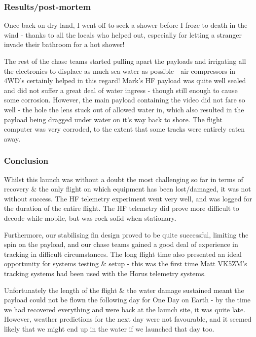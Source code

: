 \documentclass[a4paper,12pt]{article}
\begin{document}
\begin{appendices}
\subsubsection*{Results/post-mortem}

Once back on dry land, I went off to seek a shower before I froze to death in the wind - thanks to all the locals who helped out, especially for letting a stranger invade their bathroom for a hot shower! 

The rest of the chase teams started pulling apart the payloads and irrigating all the electronics to displace as much sea water as possible - air compressors in 4WD's certainly helped in this regard! Mark's HF payload was quite well sealed and did not suffer a great deal of water ingress - though still enough to cause some corrosion. However, the main payload containing the video did not fare so well - the hole the lens stuck out of allowed water in, which also resulted in the payload being dragged under water on it's way back to shore. The flight computer was very corroded, to the extent that some tracks were entirely eaten away.

\subsubsection*{Conclusion}

Whilst this launch was without a doubt the most challenging so far in terms of recovery \& the only flight on which equipment has been lost/damaged, it was not without success. The HF telemetry experiment went very well, and was logged for the duration of the entire flight. The HF telemetry did prove more difficult to decode while mobile, but was rock solid when stationary.

Furthermore, our stabilising fin design proved to be quite successful, limiting the spin on the payload, and our chase teams gained a good deal of experience in tracking in difficult circumstances. The long flight time also presented an ideal opportunity for systems testing \& setup - this was the first time Matt VK5ZM's tracking systems had been used with the Horus telemetry systems.

Unfortunately the length of the flight \& the water damage sustained meant the payload could not be flown the following day for One Day on Earth - by the time we had recovered everything and were back at the launch site, it was quite late. However, weather predictions for the next day were not favourable, and it seemed likely that we might end up in the water if we launched that day too.


\end{appendices}
\end{document}
